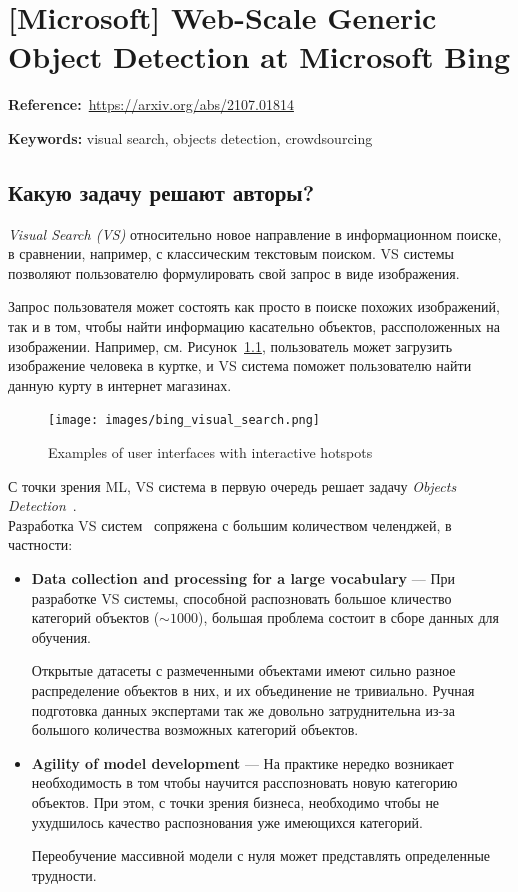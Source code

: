 \chapter{[Microsoft] Web-Scale Generic Object Detection at Microsoft Bing}

\textbf{Reference:}~\url{https://arxiv.org/abs/2107.01814}

\textbf{Keywords:} visual search, objects detection, crowdsourcing

\section*{Какую задачу решают авторы?}

\textit{Visual Search (VS)} относительно новое направление в информационном поиске, в сравнении, например, с классическим текстовым поиском.
VS системы позволяют пользователю формулировать свой запрос в виде изображения.

Запрос пользователя может состоять как просто в поиске похожих изображений, так и в том, чтобы найти информацию касательно объектов, рассположенных на изображении.
Например, см. Рисунок~\ref{fig:bing_visual_search}, пользователь может загрузить изображение человека в куртке, и VS система поможет пользователю найти данную курту в интернет магазинах.

\begin{figure}[ht]
  \centering
  \texttt{[image: images/bing\_visual\_search.png]}
  \caption{\footnotesize{Examples of user interfaces with interactive hotspots}}
  \label{fig:bing_visual_search}
\end{figure}

С точки зрения ML, VS система в первую очередь решает задачу \textit{Objects Detection}~\cite{lin2017focal}. \\

Разработка VS систем~\cite{hu2018web,zhang2018visual} сопряжена с большим количеством челенджей, в частности:
\begin{itemize}
    \item \textbf{Data collection and processing for a large vocabulary} --- При разработке VS системы, способной распозновать большое кличество категорий объектов ($\sim 1000$), большая проблема состоит в сборе данных для обучения.
    
        Открытые датасеты с размеченными объектами имеют сильно разное распределение объектов в них, и их объединение не тривиально. 
        Ручная подготовка данных экспертами так же довольно затруднительна из-за большого количества возможных категорий объектов.
    \item \textbf{Agility of model development} --- На практике нередко возникает необходимость в том чтобы научится расспозновать новую категорию объектов. 
        При этом, с точки зрения бизнеса, необходимо чтобы не ухудшилось качество распознования уже имеющихся категорий.
    
        Переобучение массивной модели с нуля может представлять определенные трудности.
\end{itemize}

